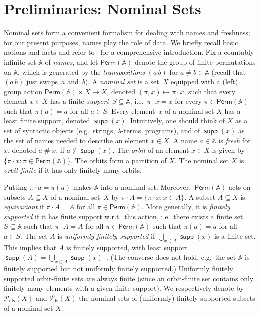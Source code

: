 \documentclass[10pt,a4paper]{amsart}
\newcommand{\compr}{:}
\renewcommand{\o}{\cdot}
\numberwithin{equation}{section}
\newcommand{\seq}{\subseteq}
\newcommand{\Perm}{\mathsf{Perm}}
\newcommand{\pow}{\mathcal{P}}
\newcommand{\fs}{\mathsf{fs}}
\newcommand{\+}[1]{\mathcal{#1}\xspace}
\newcommand{\Pow}{\mathcal{P}}
\newcommand{\ufs}{{\mathsf{ufs}}}
\newcommand{\names}{\mathbb{A}}
\DeclareMathOperator{\supp}{\mathsf{supp}} %
\newcommand{\fresh}{\mathbin{\#}}
\newcommand{\powfs}{\pow_{\fs}}
\theoremstyle{definition}
\begin{document}
\section{Preliminaries: Nominal Sets}
\label{sec:prelim}
Nominal sets form a convenient formalism for dealing with names and
freshness; for our present purposes, names play the role of data. We
briefly recall basic notions and facts and refer to~\cite{Pitts13} for a
comprehensive introduction. Fix a countably infinite set $\names$ of \emph{names}, and let $\Perm(\names)$
denote the group of finite permutations on $\names$, which is
generated by the \emph{transpositions} $(a\, b)$ for $a\neq b\in\names$
(recall that $(a\, b)$ just swaps~$a$ and~$b$). A \emph{nominal set} is a
set~$X$ equipped with a (left) group action $\Perm(\names)\times X\to X$, denoted $(\pi,x)\mapsto \pi\o x$, such that
every element $x\in X$ has a finite \emph{support}~$S\subseteq\names$,
i.e.~$\pi\cdot x=x$ for every $\pi\in \Perm(\names)$ such that $\pi(a)=a$ for all
$a\in S$. Every element~$x$ of a nominal set $X$ has a least finite
support, denoted $\supp(x)$. Intuitively, one should think of $X$ as a set of syntactic objects (e.g.~strings, $\lambda$-terms, programs), and of $\supp(x)$ as the set of names
 needed to describe an element $x\in X$. A name $a\in\names$ is \emph{fresh}
for~$x$, denoted $a\fresh x$, if $a\notin\supp(x)$. The \emph{orbit} of an element $x\in X$ is given by $\{ \pi\o x: \pi\in\Perm(\names)\}$. The orbits form a partition of $X$. The nominal set $X$ is \emph{orbit-finite} if it has only finitely many orbits.

Putting $\pi\cdot a = \pi(a)$ makes
$\names$ into a nominal set. Moreover,~$\Perm(\names)$ acts on subsets
$A\subseteq X$ of a nominal set~$X$ by
$\pi\cdot A = \{\pi\cdot x \compr x \in A\}$. A subset $A\seq X$ is \emph{equivariant} if $\pi\o A=A$ for all $\pi\in \Perm(\names)$. More generally, it is \emph{finitely
  supported} if it has finite support w.r.t.\ this action, i.e.~there exists a finite set $S\seq \names$ such that $\pi\o A = A$ for all $\pi\in \Perm(\names)$ such that $\pi(a)=a$ for all $a\in S$. The set $A$ is \emph{uniformly finitely supported} if $\bigcup_{x\in A} \supp(x)$ is a finite set. This implies that $A$ is finitely supported, with least support $\supp(A)=\bigcup_{x\in A} \supp(x)$~\cite[Theorem~2.29]{gabbay2011}. (The converse does not
hold, e.g.~the set $\names$ is finitely supported but not uniformly
finitely supported.) Uniformly finitely supported
orbit-finite sets are always finite (since an orbit-finite set contains only finitely many elements with a given finite support).  We respectively denote by $\Pow_\ufs(X)$ and $\powfs(X)$ the nominal sets of (uniformly) finitely supported subsets of a nominal set $X$. 
\end{document}
